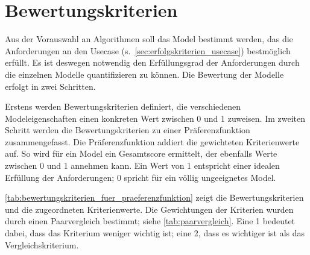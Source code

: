 \section{Bewertungskriterien}
\label{sec:bewertungskriterien}
Aus der Vorauswahl an Algorithmen soll das Model bestimmt werden, das die Anforderungen an den Usecase (s.~\cref{sec:erfolgskriterien_usecase}) bestmöglich erfüllt. Es ist deswegen notwendig den Erfüllungsgrad der Anforderungen durch die einzelnen Modelle quantifizieren zu können. Die Bewertung der Modelle erfolgt in zwei Schritten.

Erstens werden Bewertungskriterien definiert, die verschiedenen Modeleigenschaften einen konkreten Wert zwischen \num{0} und \num{1} zuweisen. Im zweiten Schritt werden die Bewertungskriterien zu einer Präferenzfunktion zusammengefasst. Die Präferenzfunktion addiert die gewichteten Kriterienwerte auf. So wird für ein Model ein Gesamtscore ermittelt, der ebenfalls Werte zwischen \num{0} und \num{1} annehmen kann. Ein Wert von \num{1} entspricht einer idealen Erfüllung der Anforderungen; \num{0} spricht für ein völlig ungeeignetes Model.

\cref{tab:bewertungskriterien_fuer_praeferenzfunktion} zeigt die Bewertungskriterien und die zugeordneten Kriterienwerte. Die Gewichtungen der Kriterien wurden durch einen Paarvergleich bestimmt; siehe \cref{tab:paarvergleich}. Eine \num{1} bedeutet dabei, dass das Kriterium weniger wichtig ist; eine \num{2}, dass es wichtiger ist als das Vergleichskriterium.

